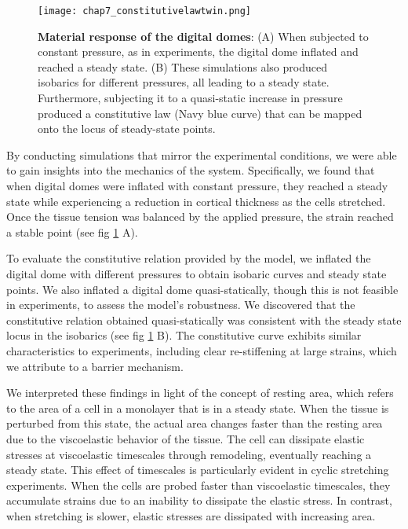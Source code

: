 \begin{figure}
	\centering
	\texttt{[image: chap7\_constitutivelawtwin.png]}
	\caption{\label{fig_7_7} \textbf{Material response of the digital domes}: (A)  When subjected to constant pressure, as in experiments, the digital dome inflated and reached a steady state. (B)  These simulations also produced isobarics for different pressures, all leading to a steady state. Furthermore, subjecting it to a quasi-static increase in pressure produced a constitutive law (Navy blue curve) that can be mapped onto the locus of steady-state points.}
\end{figure}


By conducting simulations that mirror the experimental conditions, we were able to gain insights into the mechanics of the system. Specifically, we found that when digital domes were inflated with constant pressure, they reached a steady state while experiencing a reduction in cortical thickness as the cells stretched. Once the tissue tension was balanced by the applied pressure, the strain reached a stable point (see fig \ref{fig_7_7} A).

To evaluate the constitutive relation provided by the model, we inflated the digital dome with different pressures to obtain isobaric curves and steady state points. We also inflated a digital dome quasi-statically, though this is not feasible in experiments, to assess the model's robustness. We discovered that the constitutive relation obtained quasi-statically was consistent with the steady state locus in the isobarics  (see fig \ref{fig_7_7} B). The constitutive curve exhibits similar characteristics to experiments, including clear re-stiffening at large strains, which we attribute to a barrier mechanism.

We interpreted these findings in light of the concept of resting area, which refers to the area of a cell in a monolayer that is in a steady state. When the tissue is perturbed from this state, the actual area changes faster than the resting area due to the viscoelastic behavior of the tissue. The cell can dissipate elastic stresses at viscoelastic timescales through remodeling, eventually reaching a steady state. This effect of timescales is particularly evident in cyclic stretching experiments. When the cells are probed faster than viscoelastic timescales, they accumulate strains due to an inability to dissipate the elastic stress. In contrast, when stretching is slower, elastic stresses are dissipated with increasing area.

